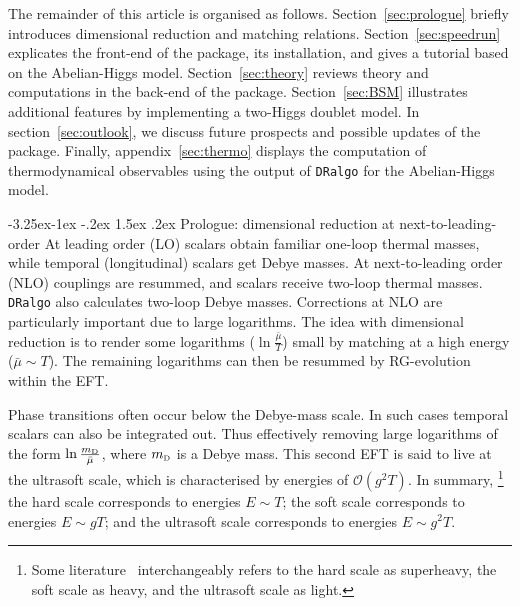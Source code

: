 \documentclass[11pt]{article}
\makeatletter
\def\dralgo{{\tt DRalgo}}
\newcommand{\mD}{m_\rmii{D}}
\newcommand{\bmu}{\bar\mu}
\newcommand{\rmii}[1]{{\mbox{\tiny\rm{#1}}}}
\renewcommand\subsection{\@startsection{subsection}{2}{\z@}%
  {-3.25ex\@plus -1ex \@minus -.2ex}%
  {1.5ex \@plus .2ex}%
  {\normalfont\normalsize\bfseries}}
\makeatother
\begin{document}
The remainder of this article is organised as follows.
Section~\ref{sec:prologue} briefly introduces
dimensional reduction and matching relations.
Section~\ref{sec:speedrun} explicates the front-end of the package,
its installation, and gives a tutorial based on the Abelian-Higgs model.
Section~\ref{sec:theory} reviews theory and computations in
the back-end of the package.
Section~\ref{sec:BSM} illustrates additional features by implementing
a two-Higgs doublet model. 
In section~\ref{sec:outlook},
we discuss future prospects and possible updates of the package.
Finally, appendix~\ref{sec:thermo}
displays the computation of thermodynamical observables using
the output of \dralgo{}
for the Abelian-Higgs model.

\subsection{Prologue: dimensional reduction at next-to-leading-order}
\label{sec:prologue}
At leading order (LO)
scalars obtain familiar one-loop thermal masses, while
temporal (longitudinal) scalars get Debye masses.
At next-to-leading order (NLO) couplings are resummed, and
scalars receive two-loop thermal masses.
\dralgo{} also calculates two-loop Debye masses.
Corrections at NLO are particularly important due to large logarithms.
The idea with dimensional reduction is to render some logarithms ($\ln\frac{\bmu}{T}$) small by
matching at a high energy ($\bmu\sim T$).
The remaining logarithms can then be resummed by
RG-evolution within the EFT.

Phase transitions often occur below the Debye-mass scale.
In such cases temporal scalars can also be integrated out.
Thus effectively removing large logarithms of the form $\ln\frac{\mD}{\bmu}$,
where $\mD$ is a Debye mass.
This second EFT is said to live at the ultrasoft scale,
which is characterised by energies of $\mathcal{O}(g^2 T)$.
%
In summary,%
\footnote{
  Some literature~\cite{Kajantie:1995dw} interchangeably refers to
  the hard scale as superheavy,
  the soft scale as heavy, and
  the ultrasoft scale as light.
}
the hard scale corresponds to energies $E\sim T$;
the soft scale corresponds to energies $E\sim g T$; and
the ultrasoft scale corresponds to energies $E\sim g^2 T$.
\end{document}
